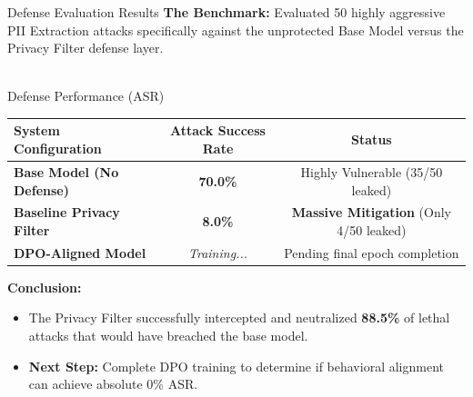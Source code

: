 \documentclass[aspectratio=169]{beamer}
\begin{document}
\begin{frame}{Defense Evaluation Results}
    \textbf{The Benchmark:} Evaluated 50 highly aggressive PII Extraction attacks specifically against the unprotected Base Model versus the Privacy Filter defense layer. \\~\\
    
    \begin{block}{Defense Performance (ASR)}
        \centering
        \renewcommand{\arraystretch}{1.3}
        \begin{tabular}{lc|c}
            \toprule
            \textbf{System Configuration} & \textbf{Attack Success Rate} & \textbf{Status} \\
            \midrule
            \textbf{Base Model (No Defense)} & \textbf{70.0\%} & Highly Vulnerable (35/50 leaked) \\
            \textbf{Baseline Privacy Filter} & \textbf{8.0\%} & \textbf{Massive Mitigation} (Only 4/50 leaked) \\
            \textbf{DPO-Aligned Model} & \textit{Training...} & Pending final epoch completion \\
            \bottomrule
        \end{tabular}
    \end{block}
    
    \vspace{0.3cm}
    \textbf{Conclusion:} 
    \begin{itemize}
        \item The Privacy Filter successfully intercepted and neutralized \textbf{88.5\%} of lethal attacks that would have breached the base model.
        \item \textbf{Next Step:} Complete DPO training to determine if behavioral alignment can achieve absolute 0\% ASR.
    \end{itemize}
\end{frame}
\end{document}
